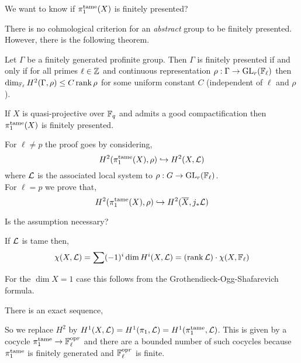 \documentclass[12pt]{article}
\begin{document}
\begin{rmk}
We want to know if $\pi_1^{\mathrm{tame}}(X)$ is finitely presented? 
\end{rmk}

\begin{rmk}
There is no cohmological criterion for an \textit{abstract} group to be finitely presented. However, there is the following theorem.
\end{rmk}

\begin{theorem}[Zebotzky]
Let $\Gamma$ be a finitely generated profinite group. Then $\Gamma$ is finitely presented if and only if for all primes $\ell \in \mathbb{Z}$ and continuous representation $\rho : \Gamma \to \mathrm{GL}_r(\mathbb{F}_\ell)$ then $\dim_{\mathbb{F}_\ell} H^2(\Gamma, \rho) \le C \operatorname{\mathrm{rank}}{\rho}$ for some uniform constant $C$ (independent of $\ell$ and $\rho$). 
\end{theorem}

\begin{theorem}
If $X$ is quasi-projective over $\mathbb{F}_q$ and admits a good compactification then $\pi_1^{\mathrm{tame}}(X)$ is finitely presented. 
\end{theorem}

\begin{rmk}
For $\ell \neq p$ the proof goes by considering,
\[ H^2(\pi_1^{\mathrm{tame}}(X), \rho) \hookrightarrow H^2(X, \mathcal{L}) \]
where $\mathcal{L}$ is the associated local system to $\rho : G \to \mathrm{GL}_r(\mathbb{F}_{\ell})$. 
\bigskip\\
For $\ell = p$ we prove that,
\[ H^2(\pi_1^{\mathrm{tame}}(X), \rho) \hookrightarrow H^2(\overline{X}, j_* \mathcal{L}) \]
\end{rmk}

\begin{rmk}
Is the assumption necessary? 
\end{rmk}

\begin{lemma}[Delgine]
If $\mathcal{L}$ is tame then,
\[ \chi(X, \mathcal{L}) = \sum (-1)^i \dim H^i(X, \mathcal{L}) = (\operatorname{\mathrm{rank}}{\mathcal{L}}) \cdot \chi(X, \mathbb{F}_\ell) \]
\end{lemma}

\begin{rmk}
For the $\dim{X} = 1$ case this follows from the Grothendieck-Ogg-Shafarevich formula.
\end{rmk}

There is an exact sequence,
\begin{center}
\end{center}
So we replace $H^2$ by $H^1(X, \mathcal{L}) = H^1(\pi_1, \mathcal{L}) = H^1(\pi_1^{\mathrm{tame}}, \mathcal{L})$. This is given by a cocycle $\pi_1^{\mathrm{tame}} \to \mathbb{F}_\ell^{\mathrm{op} r}$ and there are a bounded number of such cocycles because $\pi_1^{\mathrm{tame}}$ is finitely generated and $\mathbb{F}_{\ell}^{\mathrm{op} r}$ is finite. 
\end{document}
